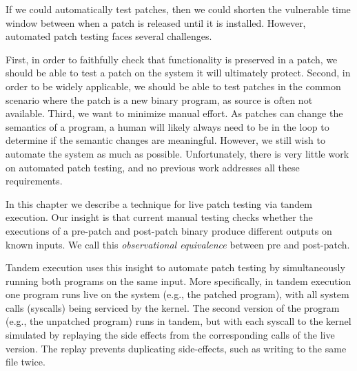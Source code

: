 
If we could automatically test patches, then we could shorten the
vulnerable time window between when a patch is released until it
is installed. However, automated patch testing faces several challenges.

First, in order to faithfully check that functionality is preserved in
a patch, we should be able to test a patch on the system it will
ultimately protect.  Second, in order to be widely applicable, we
should be able to test patches in the common scenario where the patch
is a new binary program, as source is often not available. Third, we
want to minimize manual effort. As patches can change the semantics of
a program, a human will likely always need to be in the loop to
determine if the semantic changes are meaningful. However, we still
wish to automate the system as much as possible.  Unfortunately, there
is very little work on automated patch testing, and no previous work
addresses all these requirements.


In this chapter we describe a technique for live patch testing via tandem execution.
Our insight is that current manual testing
checks whether the executions of a pre-patch and post-patch binary
produce different outputs on known inputs.  We call this
\emph{observational equivalence} between pre and post-patch.

Tandem execution uses this insight to automate patch testing by
simultaneously running both programs on the same input.  More
specifically, in tandem execution one program runs live on the
system (e.g., the patched program), with all system calls (syscalls)
being serviced by the kernel. The second version of the program (e.g.,
the unpatched program) runs in tandem, but with each syscall to the
kernel simulated by replaying the side effects from the corresponding
calls of the live version.  The replay prevents duplicating
side-effects, such as writing to the same file twice.

